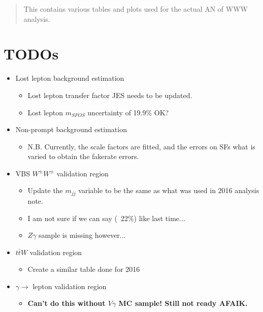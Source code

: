 \documentclass[12pt]{article}
\newcommand{\note}[1]{\textbf{\color{red} #1}}
\begin{document}
\maketitle

\begin{abstract}
This contains various tables and plots used for the actual AN of WWW analysis.
\end{abstract}

\section{TODOs}

\begin{itemize}
    \item Lost lepton background estimation
        \begin{itemize}
            \item Lost lepton transfer factor JES needs to be updated.
            \item Lost lepton $m_{SFOS}$ uncertainty of 19.9\% OK?
        \end{itemize}
    \item Non-prompt background estimation
        \begin{itemize}
            \item N.B. Currently, the scale factors are fitted, and the errors on SFs what is varied to obtain the fakerate errors.
        \end{itemize}
    \item VBS $W^{\pm}W^{\pm}$ validation region
        \begin{itemize}
            \item Update the $m_{jj}$ variable to be the same as what was used in 2016 analysis note.
            \item I am not sure if we can say (~22\%) like last time...
            \item $Z\gamma$ sample is missing however...
        \end{itemize}
    \item $t\bar{t}W$ validation region
        \begin{itemize}
            \item Create a similar table done for 2016
        \end{itemize}
    \item $\gamma\rightarrow$ lepton validation region
        \begin{itemize}
            \item \note{Can't do this without $V\gamma$ MC sample! Still not ready AFAIK.}

\end{itemize}
\end{itemize}
\end{document}
